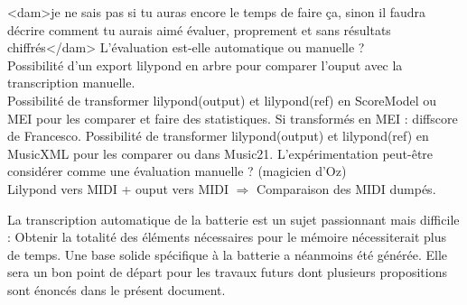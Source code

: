 \begin{itemize}
<dam>je ne sais pas si tu auras encore le temps de faire ça, sinon il faudra
décrire comment tu aurais aimé évaluer, proprement et sans résultats
chiffrés</dam>
L’évaluation est-elle automatique ou manuelle ?\\
Possibilité d’un export lilypond en arbre pour comparer l’ouput avec la
transcription manuelle.\\
Possibilité de transformer lilypond(output) et lilypond(ref) en ScoreModel ou
MEI pour les comparer et faire des statistiques. Si transformés en MEI :
diffscore de Francesco.
Possibilité de transformer lilypond(output) et lilypond(ref) en MusicXML pour
les comparer ou dans Music21.
L’expérimentation peut-être considérer comme une évaluation manuelle ?
(magicien d’Oz)\\
Lilypond vers MIDI + ouput vers MIDI $\Rightarrow$ Comparaison des MIDI
dumpés.\\


\end{itemize}

La transcription automatique de la batterie est un sujet passionnant mais
difficile : Obtenir la totalité des éléments nécessaires pour le mémoire
nécessiterait plus de temps. Une base solide spécifique à la batterie a
néanmoins été générée. Elle sera un bon point de départ pour les travaux futurs
dont plusieurs propositions sont énoncés dans le présent document.
